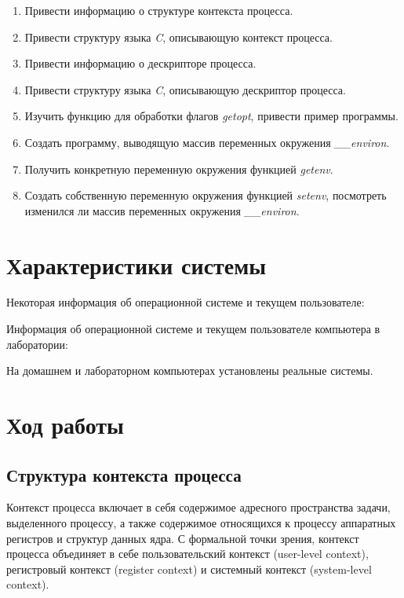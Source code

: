 \documentclass[14pt,a4paper,report]{report}
\begin{document}
\begin{enumerate}
	\item Привести информацию о структуре контекста процесса.
	\item Привести структуру языка \emph{C}, описывающую контекст процесса.
	\item Привести информацию о дескрипторе процесса.
	\item Привести структуру языка \emph{C}, описывающую дескриптор процесса.
	\item Изучить функцию для обработки флагов \emph{getopt}, привести пример программы.
	\item Создать программу, выводящую массив переменных окружения \emph{\_\_environ}.
	\item Получить конкретную переменную окружения функцией \emph{getenv}.
	\item Создать собственную переменную окружения функцией \emph{setenv}, посмотреть изменился ли массив переменных окружения \emph{\_\_environ}.
\end{enumerate}	


\section{Характеристики системы}

Некоторая информация об операционной системе и текущем пользователе:



Информация об операционной системе и текущем пользователе компьютера в лаборатории:



На домашнем и лабораторном компьютерах установлены реальные системы.

\section{Ход работы}

\subsection{Структура контекста процесса}

Контекст процесса включает в себя содержимое адресного пространства задачи, выделенного процессу, а также содержимое относящихся к процессу аппаратных регистров и структур данных ядра. С формальной точки зрения, контекст процесса объединяет в себе пользовательский контекст (user-level context), регистровый контекст (register context) и системный контекст (system-level context).
\end{document}

